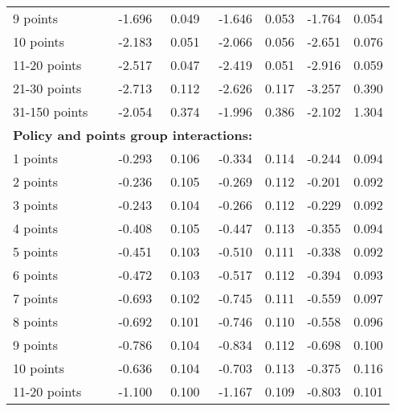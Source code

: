 \begin{table}
\begin{tabular}{l r r r r r r}
9 points  & -1.696  &  0.049  & -1.646  &  0.053  & -1.764  &  0.054   \\ 
 
10 points  & -2.183  &  0.051  & -2.066  &  0.056  & -2.651  &  0.076   \\ 
 
11-20 points  & -2.517  &  0.047  & -2.419  &  0.051  & -2.916  &  0.059   \\ 
 
21-30 points  & -2.713  &  0.112  & -2.626  &  0.117  & -3.257  &  0.390   \\ 
 
31-150 points  & -2.054  &  0.374  & -1.996  &  0.386  & -2.102  &  1.304   \\ 
 

\hline 
 
\multicolumn{4}{l}{\textbf{Policy and points group interactions:}}  \\ 
 
1 points  & -0.293  &  0.106  & -0.334  &  0.114  & -0.244  &  0.094   \\ 
 
2 points  & -0.236  &  0.105  & -0.269  &  0.112  & -0.201  &  0.092   \\ 
 
3 points  & -0.243  &  0.104  & -0.266  &  0.112  & -0.229  &  0.092   \\ 
 
4 points  & -0.408  &  0.105  & -0.447  &  0.113  & -0.355  &  0.094   \\ 
 
5 points  & -0.451  &  0.103  & -0.510  &  0.111  & -0.338  &  0.092   \\ 
 
6 points  & -0.472  &  0.103  & -0.517  &  0.112  & -0.394  &  0.093   \\ 
 
7 points  & -0.693  &  0.102  & -0.745  &  0.111  & -0.559  &  0.097   \\ 
 
8 points  & -0.692  &  0.101  & -0.746  &  0.110  & -0.558  &  0.096   \\ 
 
9 points  & -0.786  &  0.104  & -0.834  &  0.112  & -0.698  &  0.100   \\ 
 
10 points  & -0.636  &  0.104  & -0.703  &  0.113  & -0.375  &  0.116   \\ 
 
11-20 points  & -1.100  &  0.100  & -1.167  &  0.109  & -0.803  &  0.101   \\ 
 

\end{tabular}
\end{table}
